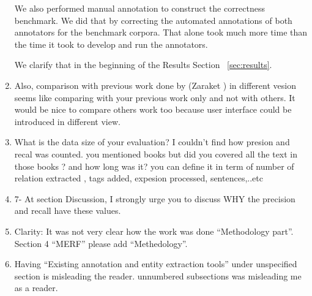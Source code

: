 \begin{enumerate}[leftmargin=0mm,label=\bfseries CommentR3.\arabic*]
{We also performed manual annotation to construct the correctness 
benchmark.
We did that by correcting the automated annotations of both annotators
for the benchmark corpora. 
That alone took much more time than the time it took to develop and run
the \framework annotators. 

We clarify that in the beginning of the Results Section ~\ref{sec:results}.
}


\item \label{Review.3.24}
Also, comparison with previous work done by (Zaraket ) 
in different vesion seems like comparing with your previous work 
only and not with others. 
It would be nice to compare others work too because user 
interface could be introduced in different view.


\item \label{Review.3.24}
What is the data size of your evaluation? 
I couldn't find how presion and recal was counted. 
you mentioned books but did you covered all the text in those 
books ? and how long was it? you can define it in term of 
number of relation extracted , tags added, expesion processed, 
sentences,..etc




\item \label{Review.3.24}
7- At section Discussion, I strongly urge you to discuss 
WHY the precision and recall have these values.


\item \label{Review.3.25}
Clarity:  
It was not very clear how the work was done 
``Methodology part''. 
Section 4 ``MERF'' please add ``Methedology''.



\item \label{Review.3.25}
Having ``Existing annotation and entity extraction tools'' 
under unspecified section is misleading the reader. 
unnumbered subsections was misleading me as a reader. 


\end{enumerate}

